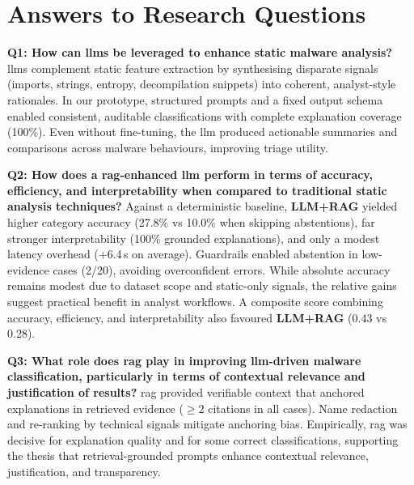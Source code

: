 \section{Answers to Research Questions}
\textbf{Q1: How can \glspl{llm} be leveraged to enhance static malware analysis?}
\newline
\glspl{llm} complement static feature extraction by synthesising disparate signals (imports,
strings, entropy, \gls{decompilation} snippets) into coherent, analyst-style rationales. In our
prototype, structured prompts and a fixed output schema enabled consistent, auditable
classifications with complete explanation coverage (100\%). Even without fine-tuning, the
\gls{llm} produced actionable summaries and comparisons across malware behaviours, improving
triage utility.

\textbf{Q2: How does a \gls{rag}-enhanced \gls{llm} perform in terms of accuracy, efficiency, and interpretability when compared to traditional static analysis techniques?}
\newline
Against a deterministic baseline, \textbf{LLM+RAG} yielded higher category accuracy (27.8\% vs
10.0\% when skipping abstentions), far stronger interpretability (100\% grounded explanations),
and only a modest latency overhead (\(+\)6.4\,s on average). Guardrails enabled abstention in
low-evidence cases (2/20), avoiding overconfident errors. While absolute accuracy remains modest
due to dataset scope and static-only signals, the relative gains suggest practical benefit in
analyst workflows. A composite score combining accuracy, efficiency, and interpretability also
favoured \textbf{LLM+RAG} (0.43 vs 0.28).

\textbf{Q3: What role does \gls{rag} play in improving \gls{llm}-driven malware classification, particularly in terms of contextual relevance and justification of results?}
\newline
\gls{rag} provided verifiable context that anchored explanations in retrieved evidence (\(\geq 2\)
citations in all cases). Name redaction and re-ranking by technical signals mitigate anchoring
bias. Empirically, \gls{rag} was decisive for explanation quality and for some correct
classifications, supporting the thesis that retrieval-grounded prompts enhance contextual
relevance, justification, and transparency.

